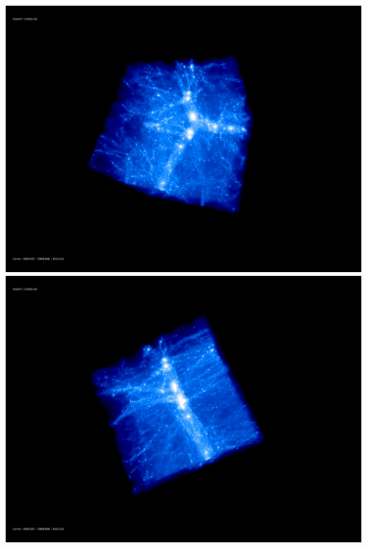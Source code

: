\includegraphics[scale=0.1]{stages_50/rotate_00074.jpg} 
\includegraphics[scale=0.1]{stages_50/rotate_00131.jpg}  \\

